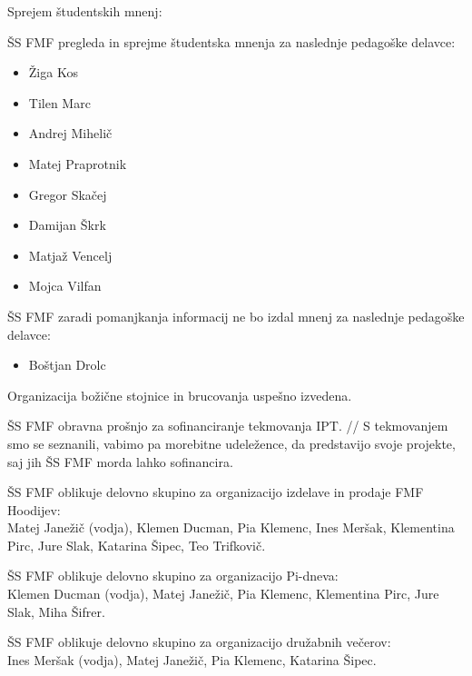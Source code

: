 \documentclass{seja}
\begin{document}
\begin{ad}
	\item
	Sprejem študentskih mnenj:
	\begin{sklep}
		ŠS FMF pregleda in sprejme študentska mnenja za naslednje pedagoške delavce:
		\begin{itemize}
			\item Žiga Kos
			\item Tilen Marc
			\item Andrej Mihelič
			\item Matej Praprotnik
			\item Gregor Skačej
			\item Damijan Škrk
			\item Matjaž Vencelj
			\item Mojca Vilfan
		\end{itemize}	
	\end{sklep}
	
	\begin{sklep}
    	ŠS FMF zaradi pomanjkanja informacij ne bo izdal mnenj za naslednje pedagoške delavce:
    	\begin{itemize}
    		\item Boštjan Drolc
    	\end{itemize}	
	\end{sklep}
	
	\item 
    Organizacija božične stojnice in brucovanja uspešno izvedena.

	\item
	ŠS FMF obravna prošnjo za sofinanciranje tekmovanja IPT. //
    S tekmovanjem smo se seznanili, vabimo pa morebitne udeležence, da predstavijo svoje projekte, saj jih ŠS FMF morda lahko sofinancira. 


	\item
	ŠS FMF oblikuje delovno skupino za organizacijo izdelave in prodaje FMF Hoodijev: \\
	Matej Janežič (vodja), Klemen Ducman, Pia Klemenc, Ines Meršak, Klementina Pirc, Jure Slak, Katarina Šipec, Teo Trifkovič.

	\item	
	ŠS FMF oblikuje delovno skupino za organizacijo Pi-dneva: \\
	Klemen Ducman (vodja), Matej Janežič, Pia Klemenc, Klementina Pirc, Jure Slak, Miha Šifrer.

	\item
	ŠS FMF oblikuje delovno skupino za organizacijo družabnih večerov: \\
	Ines Meršak (vodja), Matej Janežič, Pia Klemenc, Katarina Šipec.
	

\end{ad}
\end{document}
